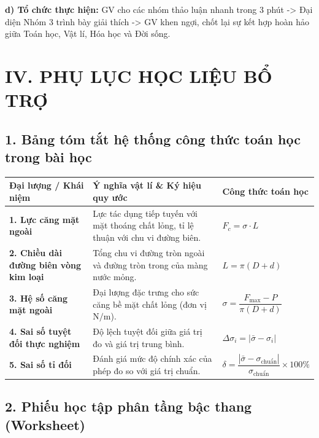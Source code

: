 \documentclass[12pt, a4paper]{article}
\begin{document}
\noindent \textbf{d) Tổ chức thực hiện:}
GV cho các nhóm thảo luận nhanh trong 3 phút -> Đại diện Nhóm 3 trình bày giải thích -> GV khen ngợi, chốt lại sự kết hợp hoàn hảo giữa Toán học, Vật lí, Hóa học và Đời sống.

\vspace{5pt}

\section*{IV. PHỤ LỤC HỌC LIỆU BỔ TRỢ}

\subsection*{1. Bảng tóm tắt hệ thống công thức toán học trong bài học}

\begin{center}
\renewcommand{\arraystretch}{1.3}
\begin{tabularx}{\textwidth}{|p{4cm}|X|p{4cm}|}
    \hline
    \textbf{Đại lượng / Khái niệm} & \textbf{Ý nghĩa vật lí \& Ký hiệu quy ước} & \textbf{Công thức toán học} \\
    \hline
    \textbf{1. Lực căng mặt ngoài} & Lực tác dụng tiếp tuyến với mặt thoáng chất lỏng, tỉ lệ thuận với chu vi đường biên. & $F_c = \sigma \cdot L$ \\
    \hline
    \textbf{2. Chiều dài đường biên vòng kim loại} & Tổng chu vi đường tròn ngoài và đường tròn trong của màng nước mỏng. & $L = \pi(D + d)$ \\
    \hline
    \textbf{3. Hệ số căng mặt ngoài} & Đại lượng đặc trưng cho sức căng bề mặt chất lỏng (đơn vị $\text{N/m}$). & $\sigma = \dfrac{F_{\text{max}} - P}{\pi(D + d)}$ \\
    \hline
    \textbf{4. Sai số tuyệt đối thực nghiệm} & Độ lệch tuyệt đối giữa giá trị đo và giá trị trung bình. & $\Delta \sigma_i = |\bar{\sigma} - \sigma_i|$ \\
    \hline
    \textbf{5. Sai số tỉ đối} & Đánh giá mức độ chính xác của phép đo so với giá trị chuẩn. & $\delta = \dfrac{|\bar{\sigma} - \sigma_{\text{chuẩn}}|}{\sigma_{\text{chuẩn}}} \times 100\%$ \\
    \hline
\end{tabularx}
\end{center}

\subsection*{2. Phiếu học tập phân tầng bậc thang (Worksheet)}
\end{document}
